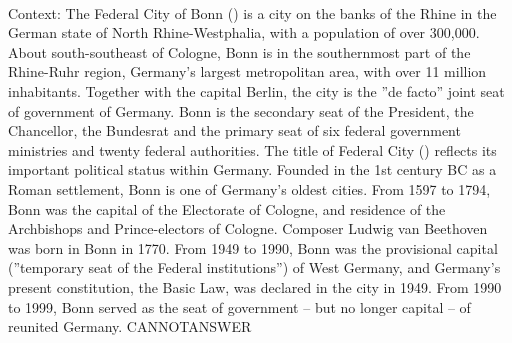 \documentclass[11pt,a4paper, onecolumn]{article}
\begin{document}
\\ Context: The Federal City of Bonn () is a city on the banks of the Rhine in the German state of North Rhine-Westphalia, with a population of over 300,000. About south-southeast of Cologne, Bonn is in the southernmost part of the Rhine-Ruhr region, Germany's largest metropolitan area, with over 11 million inhabitants. Together with the capital Berlin, the city is the ''de facto'' joint seat of government of Germany. Bonn is the secondary seat of the President, the Chancellor, the Bundesrat and the primary seat of six federal government ministries and twenty federal authorities. The title of Federal City () reflects its important political status within Germany. Founded in the 1st century BC as a Roman settlement, Bonn is one of Germany's oldest cities. From 1597 to 1794, Bonn was the capital of the Electorate of Cologne, and residence of the Archbishops and Prince-electors of Cologne. Composer Ludwig van Beethoven was born in Bonn in 1770. From 1949 to 1990, Bonn was the provisional capital (''temporary seat of the Federal institutions'') of West Germany, and Germany's present constitution, the Basic Law, was declared in the city in 1949. From 1990 to 1999, Bonn served as the seat of government – but no longer capital – of reunited Germany. CANNOTANSWER
\end{document}
